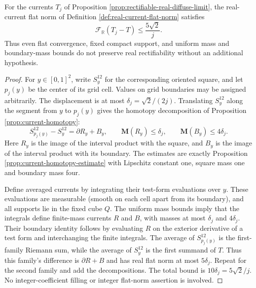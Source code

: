 \begin{proposition}\label{prop:diffuse-current-flat-rate}
For the currents $T_j$ of Proposition \ref{prop:rectifiable-real-diffuse-limit}, the real-current flat norm of Definition \ref{def:real-current-flat-norm} satisfies
\[
 \mathcal F_{\mathbb R}(T_j-T)\leq\frac{5\sqrt2}{j}.
\]
Thus even flat convergence, fixed compact support, and uniform mass and boundary-mass bounds do not preserve real rectifiability without an additional hypothesis.
\end{proposition}
\begin{proof}
For $y\in[0,1]^2$, write $S_y^{12}$ for the corresponding oriented square, and let $p_j(y)$ be the center of its grid cell. Values on grid boundaries may be assigned arbitrarily. The displacement is at most $\delta_j=\sqrt2/(2j)$. Translating $S_y^{12}$ along the segment from $y$ to $p_j(y)$ gives the homotopy decomposition of Proposition \ref{prop:current-homotopy}:
\[
 S_{p_j(y)}^{12}-S_y^{12}=\partial R_y+B_y,
 \qquad \mathbf M(R_y)\leq\delta_j,
 \qquad \mathbf M(B_y)\leq4\delta_j.
\]
Here $R_y$ is the image of the interval product with the square, and $B_y$ is the image of the interval product with its boundary. The estimates are exactly Proposition \ref{prop:current-homotopy-estimate} with Lipschitz constant one, square mass one and boundary mass four.

Define averaged currents by integrating their test-form evaluations over $y$. These evaluations are measurable (smooth on each cell apart from its boundary), and all supports lie in the fixed cube $Q$. The uniform mass bounds imply that the integrals define finite-mass currents $R$ and $B$, with masses at most $\delta_j$ and $4\delta_j$. Their boundary identity follows by evaluating $R$ on the exterior derivative of a test form and interchanging the finite integrals. The average of $S_{p_j(y)}^{12}$ is the first-family Riemann sum, while the average of $S_y^{12}$ is the first summand of $T$. Thus this family's difference is $\partial R+B$ and has real flat norm at most $5\delta_j$. Repeat for the second family and add the decompositions. The total bound is $10\delta_j=5\sqrt2/j$. No integer-coefficient filling or integer flat-norm assertion is involved.
\end{proof}

